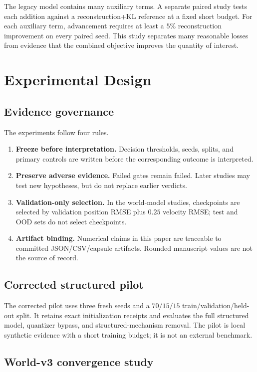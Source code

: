 \documentclass[10pt]{article}
\begin{document}
The legacy model contains many auxiliary terms. A separate paired study tests each addition against a reconstruction+KL reference at a fixed short budget. For each auxiliary term, advancement requires at least a $5\%$ reconstruction improvement on every paired seed. This study separates many reasonable losses from evidence that the combined objective improves the quantity of interest.

\section{Experimental Design}

\subsection{Evidence governance}

The experiments follow four rules.

\begin{enumerate}
    \item \textbf{Freeze before interpretation.} Decision thresholds, seeds, splits, and primary controls are written before the corresponding outcome is interpreted.
    \item \textbf{Preserve adverse evidence.} Failed gates remain failed. Later studies may test new hypotheses, but do not replace earlier verdicts.
    \item \textbf{Validation-only selection.} In the world-model studies, checkpoints are selected by validation position RMSE plus $0.25$ velocity RMSE; test and OOD sets do not select checkpoints.
    \item \textbf{Artifact binding.} Numerical claims in this paper are traceable to committed JSON/CSV/capsule artifacts. Rounded manuscript values are not the source of record.
\end{enumerate}

\subsection{Corrected structured pilot}

The corrected pilot uses three fresh seeds and a $70/15/15$ train/validation/held-out split. It retains exact initialization receipts and evaluates the full structured model, quantizer bypass, and structured-mechanism removal. The pilot is local synthetic evidence with a short training budget; it is not an external benchmark.

\subsection{World-v3 convergence study}
\end{document}
